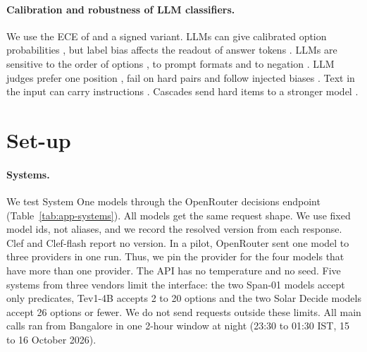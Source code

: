 \documentclass[11pt]{article}
\begin{document}
\paragraph{Calibration and robustness of LLM classifiers.}
We use the ECE of \citet{guo2017calibration} and a signed variant. LLMs can give calibrated option probabilities \citep{kadavath2022language,tian2023just}, but label bias affects the readout of answer tokens \citep{zhao2021calibrate}. LLMs are sensitive to the order of options \citep{pezeshkpour2023large,zheng2023large}, to prompt formats \citep{sclar2023quantifying} and to negation \citep{ribeiro2020beyond}. LLM judges prefer one position \citep{wang2023large,zheng2023judging}, fail on hard pairs \citep{tan2024judgebench} and follow injected biases \citep{lai2026biasscope}. Text in the input can carry instructions \citep{perez2022ignore,greshake2023what}. Cascades send hard items to a stronger model \citep{chen2023frugalgpt,ong2024routellm}.

\section{Set-up}
\label{sec:setup}

\paragraph{Systems.}
We test \nSystemOne{} System One models through the OpenRouter decisions endpoint (Table~\ref{tab:app-systems}). All models get the same request shape. We use fixed model ids, not aliases, and we record the resolved version from each response. Clef and Clef-flash report no version. In a pilot, OpenRouter sent one model to three providers in one run. Thus, we pin the provider for the four models that have more than one provider. The API has no temperature and no seed. Five systems from three vendors limit the interface: the two Span-01 models accept only predicates, Tev1-4B accepts 2 to 20 options and the two Solar Decide models accept 26 options or fewer. We do not send requests outside these limits. All main calls ran from Bangalore in one 2-hour window at night (23:30 to 01:30 IST, 15 to 16 October 2026).
\end{document}
